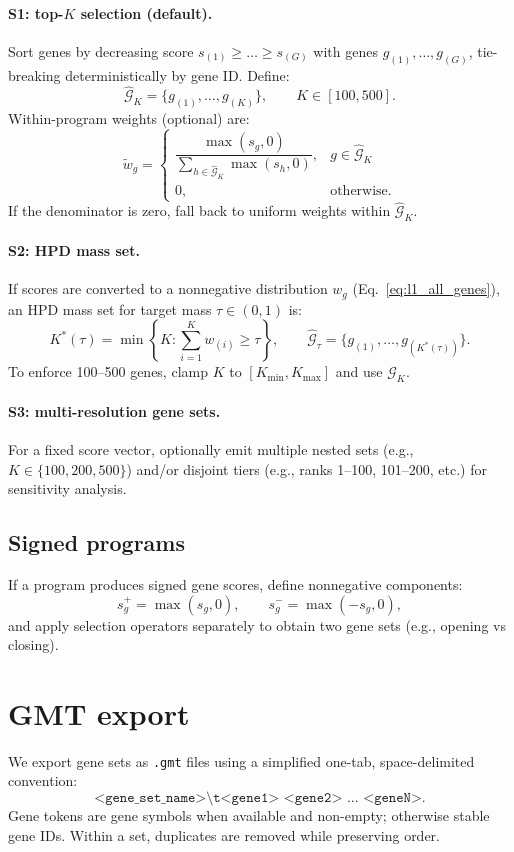 \documentclass[11pt]{article}
\begin{document}
\paragraph{S1: top-$K$ selection (default).}
Sort genes by decreasing score $s_{(1)} \ge \dots \ge s_{(G)}$ with genes $g_{(1)},\dots,g_{(G)}$, tie-breaking deterministically by gene ID.
Define:
\[
\widehat{\mathcal{G}}_{K} = \{ g_{(1)},\dots,g_{(K)} \},
\qquad K \in [100,500].
\]
Within-program weights (optional) are:
\begin{equation}
\tilde{w}_g =
\begin{cases}
\dfrac{\max(s_g,0)}{\sum_{h \in \widehat{\mathcal{G}}_K} \max(s_h,0)}, & g \in \widehat{\mathcal{G}}_K \\
0, & \text{otherwise.}
\end{cases}
\label{eq:within_program_l1}
\end{equation}
If the denominator is zero, fall back to uniform weights within $\widehat{\mathcal{G}}_K$.

\paragraph{S2: HPD mass set.}
If scores are converted to a nonnegative distribution $w_g$ (Eq.\ \ref{eq:l1_all_genes}), an HPD mass set for target mass $\tau \in (0,1)$ is:
\[
K^*(\tau) = \min\left\{K : \sum_{i=1}^K w_{(i)} \ge \tau \right\},
\qquad \widehat{\mathcal{G}}_{\tau} = \{ g_{(1)},\dots,g_{(K^*(\tau))} \}.
\]
To enforce 100--500 genes, clamp $K$ to $[K_{\min},K_{\max}]$ and use $\widehat{\mathcal{G}}_K$.

\paragraph{S3: multi-resolution gene sets.}
For a fixed score vector, optionally emit multiple nested sets (e.g., $K \in \{100,200,500\}$) and/or disjoint tiers (e.g., ranks 1--100, 101--200, etc.) for sensitivity analysis.

\subsection{Signed programs}
If a program produces signed gene scores, define nonnegative components:
\[
s_g^{+} = \max(s_g,0), \qquad s_g^{-} = \max(-s_g,0),
\]
and apply selection operators separately to obtain two gene sets (e.g., opening vs closing).

\section{GMT export}
\label{sec:gmt_export}
We export gene sets as \texttt{.gmt} files using a simplified one-tab, space-delimited convention:
\[
\texttt{<gene\_set\_name>\textbackslash t<gene1> <gene2> ... <geneN>}.
\]
Gene tokens are gene symbols when available and non-empty; otherwise stable gene IDs. Within a set, duplicates are removed while preserving order.
\end{document}
